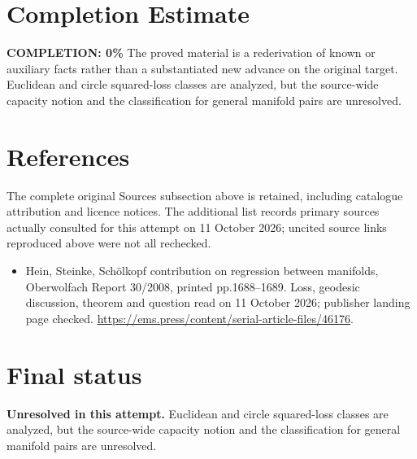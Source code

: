 \documentclass[11pt]{article}
\begin{document}
\section{Completion Estimate}
\noindent\textbf{COMPLETION: 0\%}
The proved material is a rederivation of known or auxiliary facts rather than a substantiated new advance on the original target. Euclidean and circle squared-loss classes are analyzed, but the source-wide capacity notion and the classification for general manifold pairs are unresolved.
\section{References}
The complete original Sources subsection above is retained, including catalogue attribution and licence notices. The additional list records primary sources actually consulted for this attempt on 11 October 2026; uncited source links reproduced above were not all rechecked.
\begin{itemize}
\item Hein, Steinke, Schölkopf contribution on regression between manifolds, Oberwolfach Report 30/2008, printed pp.1688--1689. Loss, geodesic discussion, theorem and question read on 11 October 2026; publisher landing page checked. \url{https://ems.press/content/serial-article-files/46176}.
\end{itemize}
\section{Final status}
\textbf{Unresolved in this attempt.} Euclidean and circle squared-loss classes are analyzed, but the source-wide capacity notion and the classification for general manifold pairs are unresolved.
\end{document}
